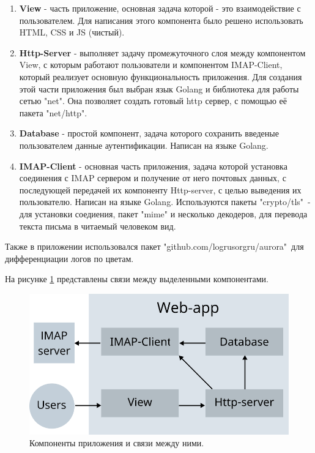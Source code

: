 \documentclass[a4paper,14pt]{extarticle}
\begin{document}
\begin{enumerate}
    \item \textbf{View} - часть приложение, основная задача которой - это взаимодействие с пользователем. 
    Для написания этого компонента было решено использовать HTML, CSS и JS (чистый).
    \item \textbf{Http-Server} - выполняет задачу промежуточного слоя между компонентом View, с которым работают пользователи
    и компонентом IMAP-Client, который реализует основную функциональность приложения. Для создания этой части приложения был выбран язык Golang
    и библиотека для работы сетью "net". Она позволяет создать готовый http сервер, с помощью её пакета "net/http".
    \item \textbf{Database} - простой компонент, задача которого сохранить введеные пользователем данные аутентификации. Написан на языке Golang.
    \item \textbf{IMAP-Client} - основная часть приложения, задача которой установка соединения с IMAP сервером и получение
    от него почтовых данных, с последующей передачей их компоненту Http-server, с целью выведения их пользователю. Написан на языке Golang.
    Используются пакеты "crypto/tls"\ - для установки соедиения, пакет "mime" и несколько декодеров, для перевода текста письма в читаемый человеком вид.
\end{enumerate}

Также в приложении использовался пакет "github.com/logrusorgru/aurora"\ для дифференциации логов по цветам.

\newpage

На рисунке \ref{architecture} представлены связи между выделенными компонентами.

\begin{figure}[H]
	\begin{center}
		\includegraphics[scale=0.4]{pics/architecture}
		\caption{Компоненты приложения и связи между ними.}
		\label{architecture}
	\end{center}
\end{figure}
\end{document}
